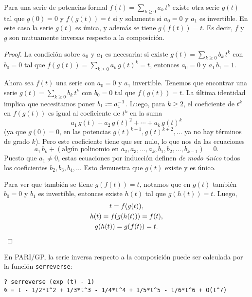\documentclass{article}
\numberwithin{equation}{section}
\theoremstyle{definition}
\begin{document}
\begin{proposicion}
  \label{prop:inversos-respecto-la-composicion}
  Para una serie de potencias formal $f (t) = \sum_{k \ge 0} a_k \, t^k$ existe
  otra serie $g (t)$ tal que $g (0) = 0$ y $f (g (t)) = t$ si y solamente si
  $a_0 = 0$ y $a_1$ es invertible. En este caso la serie $g (t)$ es única, y
  además se tiene $g (f (t)) = t$. Es decir, $f$ y $g$ son mutuamente inversas
  respecto a la composición.

  \begin{proof}
    La condición sobre $a_0$ y $a_1$ es necesaria: si existe
    $g (t) = \sum_{k\ge 0} b_k\,t^k$ con $b_0 = 0$ tal que
    $f (g (t)) = \sum_{k\ge 0} a_k\,g(t)^k = t$, entonces $a_0 = 0$ y
    $a_1\,b_1 = 1$.

    Ahora sea $f (t)$ una serie con $a_0 = 0$ y $a_1$ invertible. Tenemos que
    encontrar una serie $g (t) = \sum_{k \ge 0} b_k\,t^k$ con $b_0 = 0$ tal que
    $f (g (t)) = t$. La última identidad implica que necesitamos poner
    $b_1 \mathrel{\mathop:}= a_1^{-1}$. Luego, para $k \ge 2$, el coeficiente de $t^k$ en
    $f (g (t))$ es igual al coeficiente de $t^k$ en la suma
    $$a_1 \, g (t) + a_2 \, g (t)^2 + \cdots + a_k \, g(t)^k$$
    (ya que $g (0) = 0$, en las potencias $g (t)^{k+1}, g (t)^{k+2}, \ldots$ ya
    no hay términos de grado $k$). Pero este coeficiente tiene que ser nulo, lo
    que nos da las ecuaciones
    $$a_1\,b_k + (\text{algún polinomio en }a_2, a_3, \ldots, a_k, b_1, b_2, \ldots, b_{k-1}) = 0.$$
    Puesto que $a_1 \ne 0$, estas ecuaciones por inducción definen
    \emph{de modo único} todos los coeficientes $b_2, b_3, b_4, \ldots$ Esto
    demuestra que $g (t)$ existe y es único.

    Para ver que también se tiene $g (f (t)) = t$, notamos que en $g (t)$
    también $b_0 = 0$ y $b_1$ es invertible, entonces existe $h (t)$ tal que
    $g (h (t)) = t$. Luego,
    \begin{gather*}
      t = f (g (t)),\\
      h (t) = f (g (h (t))) = f (t),\\
      g (h (t)) = g (f (t)) = t. \qedhere
    \end{gather*}
  \end{proof}
\end{proposicion}

\begin{shaded}
  \noindent\small En PARI/GP, la serie inversa respecto a la composición puede
  ser calculada por la función \verb|serreverse|:

\begin{verbatim}
? serreverse (exp (t) - 1)
% = t - 1/2*t^2 + 1/3*t^3 - 1/4*t^4 + 1/5*t^5 - 1/6*t^6 + O(t^7)
\end{verbatim}
\end{shaded}
\end{document}
